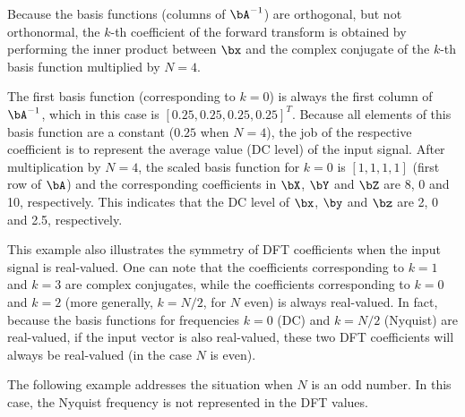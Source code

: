 Because the basis functions (columns of $\bA^{-1}$) are orthogonal, but not orthonormal, the $k$-th coefficient of the forward transform is obtained by performing the inner product between $\bx$ and the complex conjugate of the $k$-th basis function multiplied by $N=4$. 

The first basis function (corresponding to $k=0$) is always the first column of $\bA^{-1}$, which in this case is $[0.25, 0.25, 0.25, 0.25]^T$. 
Because all elements of this basis function are a constant ($0.25$ when $N=4$), the job of the respective coefficient is to represent the average value (DC level) of the input signal.
After multiplication by $N=4$, the scaled basis function for $k=0$ is $[1, 1, 1, 1]$ (first row of $\bA$) and the corresponding coefficients in $\bX$, $\bY$ and $\bZ$ are 8, 0 and 10, respectively. This indicates that the DC level of $\bx$, $\by$ and $\bz$ are 2, 0 and 2.5, respectively. 

This example also illustrates the symmetry of DFT coefficients when the input signal is real-valued. One can note that the coefficients corresponding to $k=1$ and $k=3$ are complex conjugates, while the coefficients corresponding to $k=0$ and $k=2$ (more generally, $k=N/2$, for $N$ even) is always real-valued.
In fact, because the basis functions for frequencies $k=0$ (DC) and $k=N/2$ (Nyquist) are real-valued, if the input
vector is also real-valued, these two DFT coefficients will always be real-valued (in the case $N$ is even).
\eExample 

The following example addresses the situation when $N$ is an odd number. In this case, the Nyquist frequency is not
represented in the DFT values.

